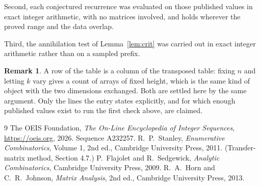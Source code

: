 \documentclass[11pt,a4paper]{article}
\theoremstyle{plain}
\theoremstyle{definition}
\newtheorem{remark}[theorem]{Remark}
\begin{document}
Second, each conjectured recurrence was evaluated on those published values in exact
integer arithmetic, with no matrices involved, and holds wherever the proved range and the
data overlap.

Third, the annihilation test of Lemma~\ref{lem:crit} was carried out in exact integer
arithmetic rather than on a sampled prefix.

\begin{remark}
A row of the table is a column of the transposed table: fixing $n$ and letting $k$ vary gives a
count of arrays of fixed height, which is the same kind of object with the two dimensions
exchanged. Both are settled here by the same argument. Only the lines the entry states
explicitly, and for which enough published values exist to run the first check above, are
claimed.
\end{remark}

\begin{thebibliography}{9}
 The OEIS Foundation, \emph{The On-Line Encyclopedia of Integer
Sequences}, \url{https://oeis.org}, 2026. Sequence A232257.
 R.~P.~Stanley, \emph{Enumerative Combinatorics}, Volume 1, 2nd ed.,
Cambridge University Press, 2011. (Transfer-matrix method, Section 4.7.)
 P.~Flajolet and R.~Sedgewick, \emph{Analytic Combinatorics}, Cambridge
University Press, 2009.
 R.~A.~Horn and C.~R.~Johnson, \emph{Matrix Analysis}, 2nd ed., Cambridge
University Press, 2013.
\end{thebibliography}
\end{document}
